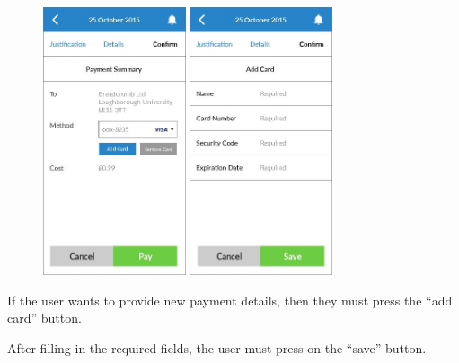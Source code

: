 \begin{figure}
  \subfigures
  \centering
  \begin{minipage}{4.6cm}
    \centering
    \includegraphics[width=4.2cm]{inc/ui_payment_step1.jpg}
    \caption{}
    \label{fig:ui_payment_step1}
  \end{minipage}
  \begin{minipage}{4.6cm}
    \centering
    \includegraphics[width=4.2cm]{inc/ui_payment_step2.jpg}
    \caption{}
    \label{fig:ui_payment_step2}
  \end{minipage}
\end{figure}

\begin{minipage}{\textwidth}
  \centering
  \begin{minipage}[t]{4.6cm}
    \vspace{0pt}
    \centering
    \begin{minipage}{4.4cm}
      If the user wants to provide new payment details, then they must press the ``add card'' button.
    \end{minipage}
  \end{minipage}
  \begin{minipage}[t]{4.6cm}
    \vspace{0pt}
    \centering
    \begin{minipage}{4.4cm}
      After filling in the required fields, the user must press on the “save” button.
    \end{minipage}
  \end{minipage}
\end{minipage}

